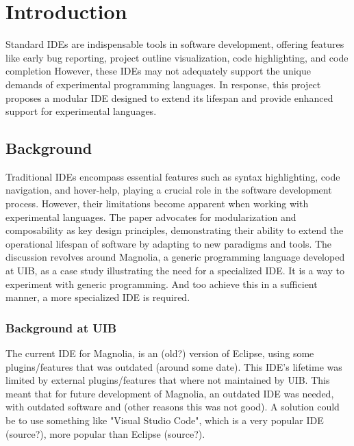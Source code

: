 \chapter{Introduction}

Standard IDEs are indispensable tools in software development, offering features
like early bug reporting, project outline visualization, code highlighting, and
code completion However, these IDEs may not adequately support the unique
demands of experimental programming languages.
In response, this project proposes
a modular IDE designed to extend its lifespan and provide enhanced support for
experimental languages.

\section{Background}

Traditional IDEs encompass essential features such as syntax highlighting, code
navigation, and hover-help, playing a crucial role in the software development
process. However, their limitations become apparent when working with
experimental languages. The paper advocates for modularization and composability
as key design principles, demonstrating their ability to extend the operational
lifespan of software by adapting to new paradigms and tools. The discussion
revolves around Magnolia, a generic programming language developed at UIB, as a
case study illustrating the need for a specialized IDE. It is a way to experiment
with generic programming. And too achieve this in a sufficient manner, a more
specialized IDE is required.

\subsection{Background at UIB}

The current IDE for Magnolia, is an (old?) version of Eclipse, using some
plugins/features that was outdated (around some date). This IDE's lifetime was
limited by external plugins/features that where not maintained by UIB. This
meant that for future development of Magnolia, an outdated IDE was needed, with
outdated software and (other reasons this was not good). A solution could be to
use something like "Visual Studio Code", which is a very popular IDE (source?),
more popular than Eclipse (source?).

